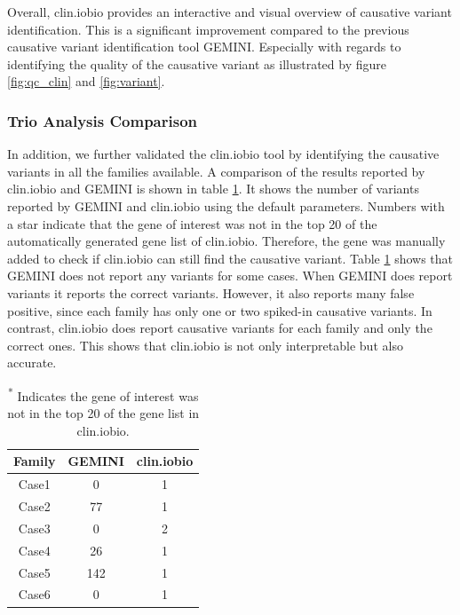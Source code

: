 Overall, clin.iobio provides an interactive and visual overview of causative variant identification. This is a significant improvement compared to the previous causative variant identification tool GEMINI. Especially with regards to identifying the quality of the causative variant as illustrated by figure \ref{fig:qc_clin} and \ref{fig:variant}.

\subsubsection*{Trio Analysis Comparison}
In addition, we further validated the clin.iobio tool by identifying the causative variants in all the families available. A comparison of the results reported by clin.iobio and GEMINI is shown in table \ref{tab:comparison}. It shows the number of variants reported by GEMINI and clin.iobio using the default parameters. Numbers with a star indicate that the gene of interest was not in the top 20 of the automatically generated gene list of clin.iobio. Therefore, the gene was manually added to check if clin.iobio can still find the causative variant. Table \ref{tab:comparison} shows that GEMINI does not report any variants for some cases. When GEMINI does report variants it reports the correct variants. However, it also reports many false positive, since each family has only one or two spiked-in causative variants. In contrast, clin.iobio does report causative variants for each family and only the correct ones. This shows that clin.iobio is not only interpretable but also accurate.

\begin{table}[bt!]
    \caption{Overview of existing Galaxy trio analysis tools and the number of variants they report.}\label{tab:comparison}
    \begin{tabular}{c c c}
        \toprule
        Family & GEMINI & clin.iobio \\
        \midrule
        Case1 & 0 & 1 \\ %
        Case2 & 77 & 1 \\ %
        Case3 & 0 & 2 \\ %
        Case4 & 26 & 1 \\ %
        Case5 & 142 & 1 \\ %
        Case6 & 0 & 1 \\ %
        \bottomrule
    \end{tabular}
    \caption{\textsuperscript{*} Indicates the gene of interest was not in the top 20 of the gene list in clin.iobio.}
\end{table}

